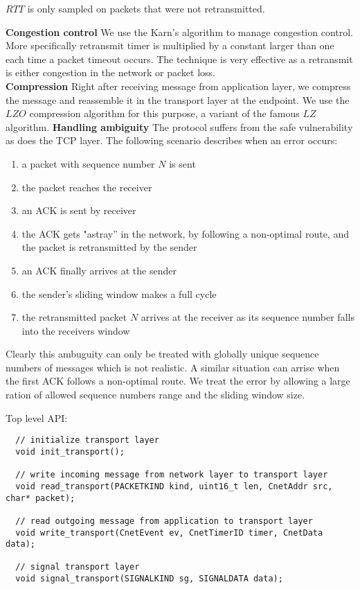 \documentclass[11pt,a4paper,oneside]{report}
\begin{document}
$RTT$ is only sampled on packets that were not retransmitted. 

\noindent \textbf{Congestion control}
We use the Karn's algorithm to manage congestion control. More specifically
retransmit timer is multiplied by a constant larger than one each time a packet
timeout occurs. The technique is very effective as a retransmit is either
congestion in the network or packet loss. \\
\noindent \textbf{Compression}
Right after receiving message from application layer, we compress the message
and reassemble it in the transport layer at the endpoint. We use the $LZO$
compression algorithm for this purpose, a variant of the famous $LZ$ algorithm.
\noindent \textbf{Handling ambiguity}
The protocol suffers from the safe vulnerability as does the TCP layer. 
The following scenario describes when an error occurs:
\begin{enumerate}
\item a packet with sequence number $N$ is sent
\item the packet reaches the receiver
\item an ACK is sent by receiver
\item the ACK gets "astray'' in the network, by following a non-optimal route, and the packet is retransmitted by the sender
\item an ACK finally arrives at the sender
\item the sender's sliding window makes a full cycle
\item the retransmitted packet $N$ arrives at the receiver as its sequence number falls into the receivers window
\end{enumerate}

Clearly this ambuguity can only be treated with globally unique sequence numbers of messages which is not realistic.
A similar situation can arrise when the first ACK follows a non-optimal route. We treat the error by allowing
a large ration of allowed sequence numbers range and the sliding window size.

    \newpage
    Top level API:  
  \begin{lstlisting}
  // initialize transport layer 
  void init_transport();
  
  // write incoming message from network layer to transport layer
  void read_transport(PACKETKIND kind, uint16_t len, CnetAddr src, char* packet);
  
  // read outgoing message from application to transport layer
  void write_transport(CnetEvent ev, CnetTimerID timer, CnetData data);
  
  // signal transport layer
  void signal_transport(SIGNALKIND sg, SIGNALDATA data);
  \end{lstlisting}
   
\end{document}

